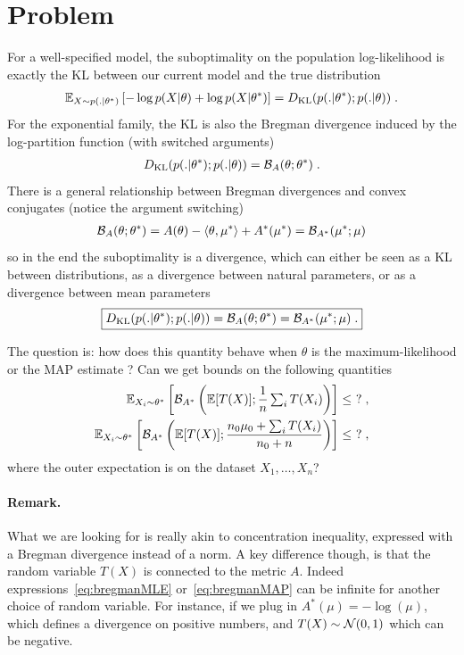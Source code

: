 \documentclass{article}
\newcommand*{\expect}[2][]{\ensuremath{\mathbb{E}_{#1} \left[ #2 \right] }} %
\newcommand{\logpart}{A}
\newcommand{\conj}{\logpart^*}
\newcommand{\bregman}{\cB_\logpart}
\newcommand{\bregmanconj}{\cB_{\logpart^*}}
\newcommand{\natp}{\theta}
\newcommand{\meanp}{\mu}
\begin{document}
\section{Problem}
For a well-specified model, the suboptimality on the population log-likelihood is exactly the KL between our current model and the true distribution
\begin{align}
    \expect[X\sim p(.|\natp^*)]{-\log p(X|\natp) + \log p(X|\natp^*) }
	= \KL( p(.|\natp^*) ; p(.|\natp)) \; .
\end{align}
For the exponential family, the KL is also the Bregman divergence induced by the log-partition function (with switched arguments)
\begin{align}
	\KL( p(.|\natp^*) ; p(.|\natp)) 
	= \bregman (\natp ; \natp^*)  \; .
\end{align}
There is a general relationship between Bregman divergences and convex conjugates (notice the argument switching)
\begin{align}
	\bregman (\natp ; \natp^*)
    = \logpart(\natp) - \langle \natp , \mu^* \rangle + \conj(\mu^*)
    = \bregmanconj ( \meanp^* ; \meanp)
\end{align}
so in the end the suboptimality is a divergence, which can either be seen as a KL between distributions, as a divergence between natural parameters, or as a divergence between mean parameters
\begin{align}
\boxed{
	\KL( p(.|\natp^*) ; p(.|\natp))
    = \bregman (\natp ; \natp^*)
    = \bregmanconj ( \meanp^* ; \meanp) \; .
}
\end{align}
\begin{important}
The question is: how does this quantity behave when $\natp$ is the maximum-likelihood or the MAP estimate ? Can we get bounds on the following quantities
\begin{align}
	\label{eq:bregmanMLE}
	\expect[X_i\sim \natp^*]{\bregmanconj \left (\E [T(X)] ;  \inv{n}  \smallsum_i T(X_i) \right )} \leq \ ? \; , \\
	\label{eq:bregmanMAP}
	\expect[X_i\sim \natp^*]{\bregmanconj \left (\E [T(X)] ; \frac{n_0 \mu_0 + \smallsum_i T(X_i)}{n_0+n} \right )} \leq \ ? \; ,
\end{align}
where the outer expectation is on the dataset $X_1, \dots, X_n$?
\end{important}

\paragraph{Remark.}
What we are looking for is really akin to concentration inequality, expressed with a Bregman divergence instead of a norm. A key difference though, is that the random variable $T(X)$ is connected to the metric $\logpart$. Indeed expressions~\eqref{eq:bregmanMLE} or~\eqref{eq:bregmanMAP} can be infinite for another choice of random variable. For instance, if we plug in $\conj(\mu)= -\log(\mu)$, which defines a divergence on positive numbers, and $T(X) \sim {\mathcal N}(0,1)$ which can be negative.
\end{document}
